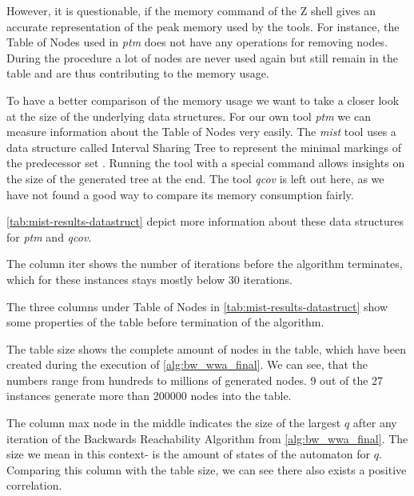 \bigbreak

However, it is questionable, if the memory command of the Z shell gives an accurate representation of the peak memory used by the tools. For instance, the Table of Nodes used in \textit{ptm} does not have any operations for removing nodes. During the procedure a lot of nodes are never used again but still remain in the table and are thus contributing to the memory usage.

To have a better comparison of the memory usage we want to take a closer look at the size of the underlying data structures. For our own tool \textit{ptm} we can measure information about the Table of Nodes very easily. The \textit{mist} tool uses a data structure called Interval Sharing Tree to represent the minimal markings of the predecessor set \cite{ganty_07,ganty_15}. Running the tool with a special command allows insights on the size of the generated tree at the end. 
The tool \textit{qcov} is left out here, as we have not found a good way to compare its memory consumption fairly. 
\bigbreak

\autoref{tab:mist-results-datastruct} depict more information about these data structures for \textit{ptm} and \textit{qcov}.

The column iter shows the number of iterations before the algorithm terminates, which for these instances stays mostly below 30 iterations.

The three columns under Table of Nodes in \autoref{tab:mist-results-datastruct} show some properties of the table before termination of the algorithm.

The table size shows the complete amount of nodes in the table, which have been created during the execution of \autoref{alg:bw_wwa_final}. We can see, that the numbers range from hundreds to millions of generated nodes. 9 out of the 27 instances generate more than 200000 nodes into the table.

The column max node in the middle indicates the size of the largest $q$ after any iteration of the Backwards Reachability Algorithm from \autoref{alg:bw_wwa_final}. The size we mean in this context- is the amount of states of the automaton for $q$. Comparing this column with the table size, we can see there also exists a positive correlation. 

